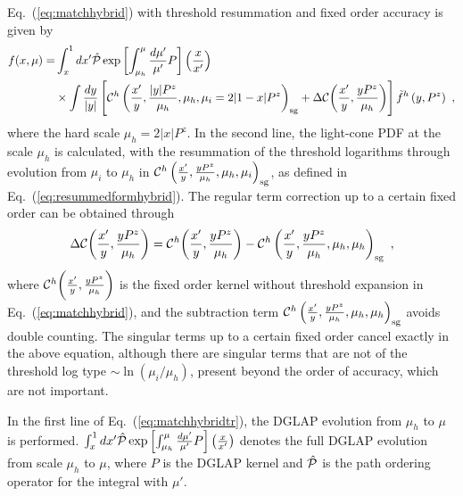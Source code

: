 \documentclass[a4paper,11pt]{article}
\begin{document}
Eq.~(\ref{eq:matchhybrid}) with threshold resummation and fixed order accuracy is given by  
\begin{align}\label{eq:matchhybridtr}
f(x,\mu)  =  & \int_{x}^{1} d x' \hat{\cal P} \exp{\left[\int_{\mu_h}^{\mu} \frac{d\mu'}{\mu'} P \right]\left(\frac{x}{x'}\right)} \, \\
&\times \int \frac{dy}{|y|} \left[ {\cal C}^{h}\left(\frac{x'}{y},\frac{|y| P^z}{\mu_h},\mu_h,\mu_i=2|1-x|P^z\right)_{\rm sg} + \Delta {\cal C}\bigg(\frac{x'}{y},\frac{y P^z}{\mu_h}\bigg) \right] \tilde f^{h}\left(y,P^z\right) \ ,  \nonumber
\end{align}
where the hard scale $\mu_h=2|x|P^z$. In the second line, the light-cone PDF at the scale $\mu_h$ is calculated, with the resummation of the threshold logarithms through evolution from $\mu_i$ to $\mu_h$ in ${\cal C}^{h}\left(\frac{x'}{y},\frac{y P^z}{\mu_h},\mu_h,\mu_i\right)_{\rm sg}$, as defined in Eq.~(\ref{eq:resummedformhybrid}). The regular term correction up to a certain fixed order can be obtained through 
\begin{align}\label{eq:matchhybridcor}
\Delta {\cal C}\bigg(\frac{x'}{y},\frac{y P^z}{\mu_h}\bigg) = {\cal C}^{h}\bigg(\frac{x'}{y},\frac{y P^z}{\mu_h}\bigg) - {\cal C}^{h}\left(\frac{x'}{y},\frac{y P^z}{\mu_h},\mu_h,\mu_h\right)_{\rm sg} \ ,
\end{align}
where ${\cal C}^{h}\bigg(\frac{x'}{y},\frac{y P^z}{\mu_h}\bigg)$ is the fixed order kernel without threshold expansion in Eq.~(\ref{eq:matchhybrid}), and the subtraction term ${\cal C}^{h}\left(\frac{x'}{y},\frac{y P^z}{\mu_h},\mu_h,\mu_h\right)_{\rm sg}$ avoids double counting. The singular terms up to a certain fixed order cancel exactly in the above equation, although there are singular terms that are not of the threshold log type $\sim \ln\left(\mu_i/\mu_h\right)$, present beyond the order of accuracy, which are not important. 

In the first line of Eq.~(\ref{eq:matchhybridtr}), the DGLAP evolution from $\mu_h$ to $\mu$ is performed. $\int_{x}^{1} d x' \hat{\cal P} \exp{\left[\int_{\mu_h}^{\mu} \frac{d\mu'}{\mu'} P \right]\left(\frac{x}{x'}\right)}$ denotes the full DGLAP evolution~\cite{Moch:2004pa,Vogt:2004mw} from scale $\mu_h$ to $\mu$, where $P$ is the DGLAP kernel and $\hat{\cal P}$ is the path ordering operator for the integral with $\mu'$. 
\end{document}
